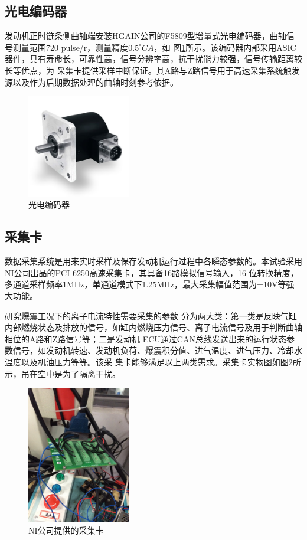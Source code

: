 \subsection{光电编码器}
发动机正时链条侧曲轴端安装HGAIN公司的F5809型增量式光电编码器，曲轴信号测量范围720 pulse/r，测量精度$0.5^{\circ}CA$，如
图\ref{fig:gdbmq}所示。该编码器内部采用ASIC器件，具有寿命长，可靠性高，信号分辨率高，抗干扰能力较强，信号传输距离较长等优点，为
采集卡提供采样中断保证。其A路与Z路信号用于高速采集系统触发源以及作为后期数据处理的曲轴时刻参考依据。
\begin{figure}[H]
	\centering
	\includegraphics[width=0.4\textwidth]{thesis_figure/platformer_chapter/gdbmq}
	\caption{光电编码器}
	\label{fig:gdbmq}
\end{figure}
\subsection{采集卡}
数据采集系统是用来实时采样及保存发动机运行过程中各瞬态参数的。本试验采用NI公司出品的PCI 6250高速采集卡，其具备16路模拟信号输入，16
位转换精度，多通道采样频率1MHz，单通道模式下1.25MHz，最大采集幅值范围为±10V等强大功能。\par 研究爆震工况下的离子电流特性需要采集的参数
分为两大类：第一类是反映气缸内部燃烧状态及排放的信号，如缸内燃烧压力信号、离子电流信号及用于判断曲轴相位的A路和Z路信号等；二是发动机
ECU通过CAN总线发送出来的运行状态参数信号，如发动机转速、发动机负荷、爆震积分值、进气温度、进气压力、冷却水温度以及机油压力等等。该采
集卡能够满足以上两类需求。采集卡实物图如图\ref{fig:nicjk}所示，吊在空中是为了隔离干扰。
\begin{figure}[H]
	\centering
	\includegraphics[width=0.4\textwidth]{thesis_figure/platformer_chapter/nicjk}
	\caption{NI公司提供的采集卡}
	\label{fig:nicjk}
\end{figure}
